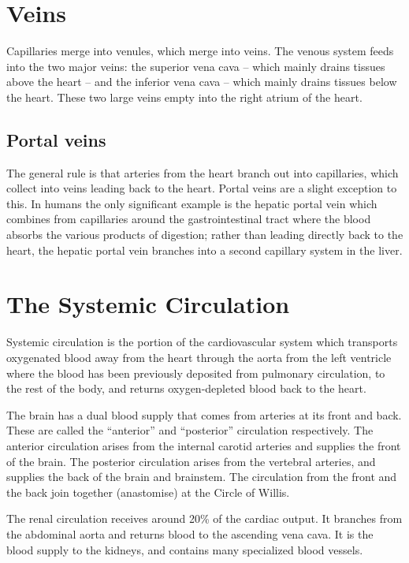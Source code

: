 \hypertarget{veins}{%
\section{Veins}\label{veins}}

Capillaries merge into venules, which merge into veins. The venous system feeds into the two major veins: the superior vena cava -- which mainly drains tissues above the heart -- and the inferior vena cava -- which mainly drains tissues below the heart. These two large veins empty into the right atrium of the heart.

\hypertarget{portal-veins}{%
\subsection{Portal veins}\label{portal-veins}}

The general rule is that arteries from the heart branch out into capillaries, which collect into veins leading back to the heart. Portal veins are a slight exception to this. In humans the only significant example is the hepatic portal vein which combines from capillaries around the gastrointestinal tract where the blood absorbs the various products of digestion; rather than leading directly back to the heart, the hepatic portal vein branches into a second capillary system in the liver.

\hypertarget{the-systemic-circulation}{%
\section{The Systemic Circulation}\label{the-systemic-circulation}}

Systemic circulation is the portion of the cardiovascular system which transports oxygenated blood away from the heart through the aorta from the left ventricle where the blood has been previously deposited from pulmonary circulation, to the rest of the body, and returns oxygen-depleted blood back to the heart.

The brain has a dual blood supply that comes from arteries at its front and back. These are called the ``anterior'' and ``posterior'' circulation respectively. The anterior circulation arises from the internal carotid arteries and supplies the front of the brain. The posterior circulation arises from the vertebral arteries, and supplies the back of the brain and brainstem. The circulation from the front and the back join together (anastomise) at the Circle of Willis.

The renal circulation receives around 20\% of the cardiac output. It branches from the abdominal aorta and returns blood to the ascending vena cava. It is the blood supply to the kidneys, and contains many specialized blood vessels.

